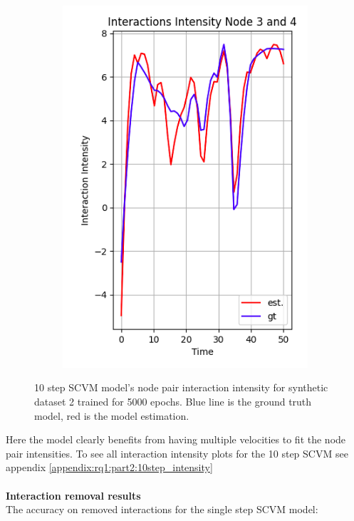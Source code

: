 \begin{figure}[H]
\begin{subfigure}[b]{0.45\textwidth}
        \includegraphics[width=\textwidth]{0_images/rq1_10step_SCVM_intensity2.png}
    \end{subfigure}
    \caption{10 step SCVM model's node pair interaction intensity for synthetic dataset 2 trained for 5000 epochs. Blue line is the ground truth model, red is the model estimation.}
    \label{fig:RQ1:part2:10step_intensity}
\end{figure}
\noindent
Here the model clearly benefits from having multiple velocities to fit the node pair intensities. To see all interaction intensity plots for the 10 step SCVM see appendix \ref{appendix:rq1:part2:10step_intensity}
\\\\
\noindent
\textbf{Interaction removal results}
\\
The accuracy on removed interactions for the single step SCVM model:
